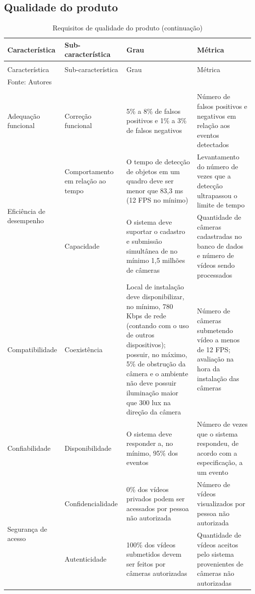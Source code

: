 \documentclass[]{politex}
\begin{document}
\subsection{Qualidade do produto}
\begin{center}
\begin{longtable}{||m{3cm} | m{4cm} | m{4cm} | m{4cm}||} 
\caption{\label{tab:qualidade_produto}Requisitos de qualidade do produto}\\
\hline
Característica & Sub-característica & Grau & Métrica \\
\hline\hline
\endfirsthead
\caption[]{Requisitos de qualidade do produto (continuação)} \\
\hline
Característica & Sub-característica & Grau & Métrica \\
\hline\hline
\endhead
\hline\hline
\multicolumn{4}{l}{Fonte: Autores} \\
\endlastfoot
\hline
\multicolumn{4}{r}{\footnotesize{}continua na próxima página} \\
\endfoot
 
Adequação funcional & Correção funcional & 5\% a 8\% de falsos positivos e 1\% a 3\% de falsos negativos & Número de falsos positivos e negativos em relação aos eventos detectados\\
\hline

\multirow{2}{3cm}{Eficiência de desempenho} & Comportamento em relação ao tempo & O tempo de detecção de objetos em um quadro deve ser menor que 83,3 ms (12 FPS no mínimo) & Levantamento do número de vezes que a detecção ultrapassou o limite de tempo \\ \cline{2-4}
& Capacidade & O sistema deve suportar o cadastro e submissão simultânea de no mínimo 1,5 milhões de câmeras & Quantidade de câmeras cadastradas no banco de dados e número de vídeos sendo processados \\
\hline

Compatibilidade & Coexistência & Local de instalação deve disponibilizar, no mínimo, 780 Kbps de rede (contando com o uso de outros dispositivos); possuir, no máximo, 5\% de obstrução da câmera e o ambiente não deve possuir iluminação maior que 300 lux na direção da câmera & Número de câmeras submetendo vídeo a menos de 12 FPS; avaliação na hora da instalação das câmeras \\
\hline

Confiabilidade & Disponibilidade & O sistema deve responder a, no mínimo, 95\% dos eventos & Número de vezes que o sistema respondeu, de acordo com a especificação, a um evento \\
\hline

\multirow{2}{3cm}{Segurança de acesso} & Confidencialidade & 0\% dos vídeos privados podem ser acessados por pessoa não autorizada & Número de vídeos visualizados por pessoa não autorizada \\ \cline{2-4}
& Autenticidade & 100\% dos vídeos submetidos devem ser feitos por câmeras autorizadas & Quantidade de vídeos aceitos pelo sistema provenientes de câmeras não autorizadas \\
\end{longtable}
\end{center}
\end{document}
